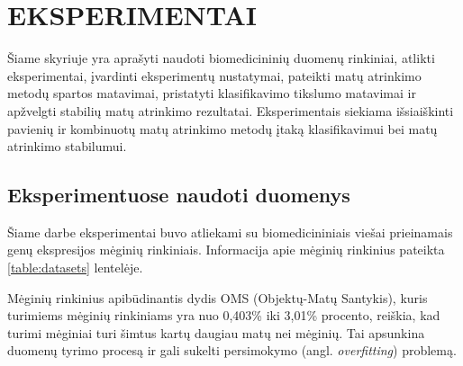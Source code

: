 \section{EKSPERIMENTAI}
\label{eksperimentai}

Šiame skyriuje yra aprašyti naudoti biomedicininių duomenų rinkiniai, atlikti eksperimentai, įvardinti eksperimentų nustatymai, pateikti matų atrinkimo metodų spartos matavimai, pristatyti klasifikavimo tikslumo matavimai ir apžvelgti stabilių matų atrinkimo rezultatai. Eksperimentais siekiama išsiaiškinti pavienių ir kombinuotų matų atrinkimo metodų įtaką klasifikavimui bei matų atrinkimo stabilumui.

\subsection{Eksperimentuose naudoti duomenys}
\label{eksperimentuose_naudoti_duomenys}

Šiame darbe eksperimentai buvo atliekami su biomedicininiais viešai prieinamais genų ekspresijos mėginių rinkiniais. Informacija apie mėginių rinkinius pateikta \ref{table:datasets} lentelėje. 

Mėginių rinkinius apibūdinantis dydis OMS (Objektų-Matų Santykis), kuris turimiems mėginių rinkiniams yra nuo 0,403\% iki 3,01\% procento, reiškia, kad turimi mėginiai turi šimtus kartų daugiau matų nei mėginių. Tai apsunkina duomenų tyrimo procesą ir gali sukelti persimokymo (angl. \textit{overfitting}) problemą.

